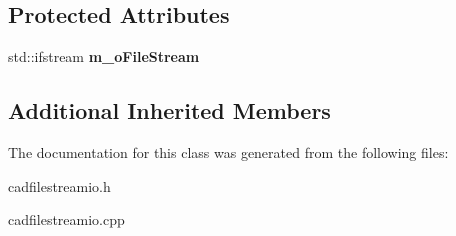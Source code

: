 \subsection*{Protected Attributes}
\begin{DoxyCompactItemize}
\item 
std\+::ifstream {\bfseries m\+\_\+o\+File\+Stream}\hypertarget{class_c_a_d_file_stream_i_o_ad7a150910d7f2d1502d85263ceff709f}{}\label{class_c_a_d_file_stream_i_o_ad7a150910d7f2d1502d85263ceff709f}

\end{DoxyCompactItemize}
\subsection*{Additional Inherited Members}


The documentation for this class was generated from the following files\+:\begin{DoxyCompactItemize}
\item 
cadfilestreamio.\+h\item 
cadfilestreamio.\+cpp\end{DoxyCompactItemize}
